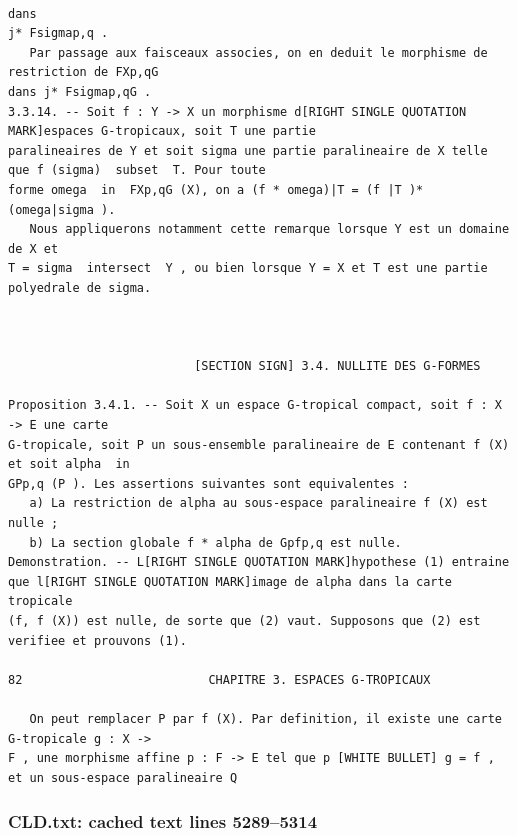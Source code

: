 \documentclass[
  11pt,
]{article}
\begin{document}
\begin{lstlisting}
                                                                                       dans
j* Fsigmap,q .
   Par passage aux faisceaux associes, on en deduit le morphisme de restriction de FXp,qG
dans j* Fsigmap,qG .
3.3.14. -- Soit f : Y -> X un morphisme d[RIGHT SINGLE QUOTATION MARK]espaces G-tropicaux, soit T une partie
paralineaires de Y et soit sigma une partie paralineaire de X telle que f (sigma)  subset  T. Pour toute
forme omega  in  FXp,qG (X), on a (f * omega)|T = (f |T )* (omega|sigma ).
   Nous appliquerons notamment cette remarque lorsque Y est un domaine de X et
T = sigma  intersect  Y , ou bien lorsque Y = X et T est une partie polyedrale de sigma.



                          [SECTION SIGN] 3.4. NULLITE DES G-FORMES

Proposition 3.4.1. -- Soit X un espace G-tropical compact, soit f : X -> E une carte
G-tropicale, soit P un sous-ensemble paralineaire de E contenant f (X) et soit alpha  in 
GPp,q (P ). Les assertions suivantes sont equivalentes :
   a) La restriction de alpha au sous-espace paralineaire f (X) est nulle ;
   b) La section globale f * alpha de Gpfp,q est nulle.
Demonstration. -- L[RIGHT SINGLE QUOTATION MARK]hypothese (1) entraine que l[RIGHT SINGLE QUOTATION MARK]image de alpha dans la carte tropicale
(f, f (X)) est nulle, de sorte que (2) vaut. Supposons que (2) est verifiee et prouvons (1).

82                          CHAPITRE 3. ESPACES G-TROPICAUX

   On peut remplacer P par f (X). Par definition, il existe une carte G-tropicale g : X ->
F , une morphisme affine p : F -> E tel que p [WHITE BULLET] g = f , et un sous-espace paralineaire Q
\end{lstlisting}

\subsubsection{CLD.txt: cached text lines
5289--5314}\label{cld.txt-cached-text-lines-52895314}
\end{document}
